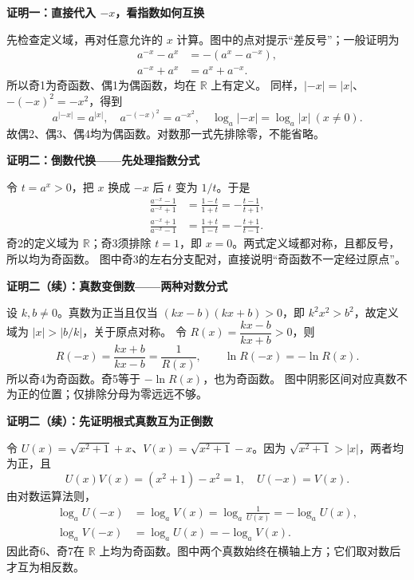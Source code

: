 \clearpage
\begin{proofbox}
\textbf{\textcolor{CProof}{证明一：直接代入 $-x$，看指数如何互换}}


先检查定义域，再对任意允许的 $x$ 计算。图中的点对提示“差反号”；一般证明为
\[
\begin{aligned}
a^{-x}-a^x&=-(a^x-a^{-x}),\\
a^{-x}+a^x&=a^x+a^{-x}.
\end{aligned}
\]
所以奇1为奇函数、偶1为偶函数，均在 $\mathbb R$ 上有定义。
同样，$|-x|=|x|$、$-(-x)^2=-x^2$，得到
\[
a^{|-x|}=a^{|x|},\quad a^{-(-x)^2}=a^{-x^2},\quad
\log_a|-x|=\log_a|x|\ (x\ne0).
\]
故偶2、偶3、偶4均为偶函数。对数那一式先排除零，不能省略。
\end{proofbox}
\clearpage
\begin{proofbox}
\textbf{\textcolor{CProof}{证明二：倒数代换——先处理指数分式}}


令 $t=a^x>0$，把 $x$ 换成 $-x$ 后 $t$ 变为 $1/t$。于是
\[
\begin{aligned}
\frac{a^{-x}-1}{a^{-x}+1}&=\frac{1-t}{1+t}=-\frac{t-1}{t+1},\\[3pt]
\frac{a^{-x}+1}{a^{-x}-1}&=\frac{1+t}{1-t}=-\frac{t+1}{t-1}.
\end{aligned}
\]
奇2的定义域为 $\mathbb R$；奇3须排除 $t=1$，即 $x=0$。两式定义域都对称，且都反号，所以均为奇函数。
图中奇3的左右分支配对，直接说明“奇函数不一定经过原点”。
\end{proofbox}
\clearpage
\begin{proofbox}
\textbf{\textcolor{CProof}{证明二（续）：真数变倒数——两种对数分式}}


设 $k,b\ne0$。真数为正当且仅当 $(kx-b)(kx+b)>0$，即
$k^2x^2>b^2$，故定义域为 $|x|>|b/k|$，关于原点对称。
令 $R(x)=\dfrac{kx-b}{kx+b}>0$，则
\[
R(-x)=\frac{kx+b}{kx-b}=\frac1{R(x)},\qquad
\ln R(-x)=-\ln R(x).
\]
所以奇4为奇函数。奇5等于 $-\ln R(x)$，也为奇函数。
图中阴影区间对应真数不为正的位置；仅排除分母为零远远不够。
\end{proofbox}
\clearpage
\begin{proofbox}
\textbf{\textcolor{CProof}{证明二（续）：先证明根式真数互为正倒数}}


令 $U(x)=\sqrt{x^2+1}+x$、$V(x)=\sqrt{x^2+1}-x$。因为 $\sqrt{x^2+1}>|x|$，两者均为正，且
\[
U(x)V(x)=(x^2+1)-x^2=1,\quad U(-x)=V(x).
\]
由对数运算法则，
\[
\begin{aligned}
\log_a U(-x)&=\log_a V(x)=\log_a\frac1{U(x)}=-\log_a U(x),\\
\log_a V(-x)&=\log_a U(x)=-\log_a V(x).
\end{aligned}
\]
因此奇6、奇7在 $\mathbb R$ 上均为奇函数。图中两个真数始终在横轴上方；它们取对数后才互为相反数。
\end{proofbox}
